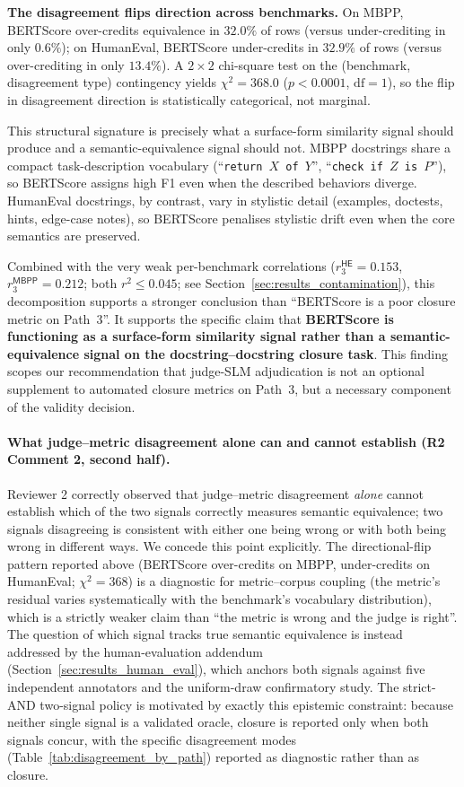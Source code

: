 \textbf{The disagreement flips direction across benchmarks.} On MBPP, BERTScore over-credits equivalence in $32.0\%$ of rows (versus under-crediting in only $0.6\%$); on HumanEval, BERTScore under-credits in $32.9\%$ of rows (versus over-crediting in only $13.4\%$). A $2 \times 2$ chi-square test on the (benchmark, disagreement type) contingency yields $\chi^2 = 368.0$ ($p < 0.0001$, $\text{df} = 1$), so the flip in disagreement direction is statistically categorical, not marginal.

This structural signature is precisely what a surface-form similarity signal should produce and a semantic-equivalence signal should not. MBPP docstrings share a compact task-description vocabulary (``\texttt{return $X$ of $Y$}'', ``\texttt{check if $Z$ is $P$}''), so BERTScore assigns high F1 even when the described behaviors diverge. HumanEval docstrings, by contrast, vary in stylistic detail (examples, doctests, hints, edge-case notes), so BERTScore penalises stylistic drift even when the core semantics are preserved.

Combined with the very weak per-benchmark correlations ($r_3^{\textsf{HE}} = 0.153$, $r_3^{\textsf{MBPP}} = 0.212$; both $r^2 \leq 0.045$; see Section~\ref{sec:results_contamination}), this decomposition supports a stronger conclusion than ``BERTScore is a poor closure metric on Path~3''. It supports the specific claim that \textbf{BERTScore is functioning as a surface-form similarity signal rather than a semantic-equivalence signal on the docstring--docstring closure task}. This finding scopes our recommendation that judge-SLM adjudication is not an optional supplement to automated closure metrics on Path~3, but a necessary component of the validity decision.

\paragraph{What judge--metric disagreement alone can and cannot establish (R2 Comment 2, second half).}
Reviewer 2 correctly observed that judge--metric disagreement \emph{alone} cannot establish which of the two signals correctly measures semantic equivalence; two signals disagreeing is consistent with either one being wrong or with both being wrong in different ways. We concede this point explicitly. The directional-flip pattern reported above (BERTScore over-credits on MBPP, under-credits on HumanEval; $\chi^2 = 368$) is a diagnostic for metric--corpus coupling (the metric's residual varies systematically with the benchmark's vocabulary distribution), which is a strictly weaker claim than ``the metric is wrong and the judge is right''. The question of which signal tracks true semantic equivalence is instead addressed by the human-evaluation addendum (Section~\ref{sec:results_human_eval}), which anchors both signals against five independent annotators and the uniform-draw confirmatory study. The strict-AND two-signal policy is motivated by exactly this epistemic constraint: because neither single signal is a validated oracle, closure is reported only when both signals concur, with the specific disagreement modes (Table~\ref{tab:disagreement_by_path}) reported as diagnostic rather than as closure.

